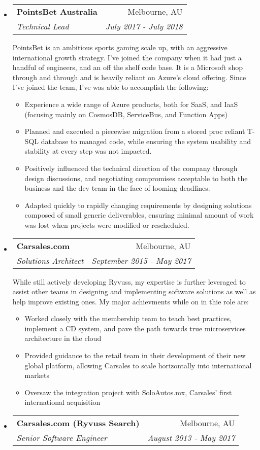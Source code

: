 \documentclass[letterpaper,11pt]{article}
\makeatletter
\newcommand{\resitem}[1]{\item #1 \vspace{-2pt}}
\newcommand{\ressubheading}[4]{
\begin{tabular*}{6.5in}{l@{\cftdotfill{\cftsecdotsep}\extracolsep{\fill}}r}
		\textbf{#1} & #2 \\
		\textit{#3} & \textit{#4} \\
\end{tabular*}}
\makeatother
\begin{document}
\begin{itemize}
\item[]
	\ressubheading{PointsBet Australia}{Melbourne, AU}{Technical Lead}{July 2017 - July 2018}
	
	PointsBet is an ambitious sports gaming scale up, with an aggressive international growth strategy. I've joined the company when it had just a handful of engineers, and an off the shelf code base. It is a Microsoft shop through and through and is heavily reliant on Azure's cloud offering. Since I've joined the team, I've was able to accomplish the following:
	
	\begin{itemize}
		\resitem{Experience a wide range of Azure products, both for SaaS, and IaaS (focusing mainly on CosmosDB, ServiceBus, and Function Apps)}
		\resitem{Planned and executed a piecewise migration from a stored proc reliant T-SQL database to managed code, while ensuring the system usability and stability at every step was not impacted.}
		\resitem{Positively influenced the technical direction of the company through design discussions, and negotiating compromises acceptable to both the business and the dev team in the face of looming deadlines.}
		\resitem{Adapted quickly to rapidly changing requirements by designing solutions composed of small generic deliverables, ensuring minimal amount of work was lost when projects were modified or rescheduled.}
	\end{itemize}
	
\item[]
	\ressubheading{Carsales.com}{Melbourne, AU}{Solutions Architect}{September 2015 - May 2017}

	While still actively developing Ryvuss, my expertise is further leveraged to assist other teams in designing and implementing software solutions as well as help improve existing ones. My major achievments while on in thie role are:
	\begin{itemize}
		\resitem{Worked closely with the membership team to teach best practices, implement a CD system, and pave the path towards true microservices architecture in the cloud}
		\resitem{Provided guidance to the retail team in their development of their new global platform, allowing Carsales to scale horizontally into international markets}
		\resitem{Oversaw the integration project with SoloAutos.mx, Carsales' first international acquisition}
	\end{itemize}
	
\item[]
	\ressubheading{Carsales.com (Ryvuss Search)}{Melbourne, AU}{Senior Software Engineer}{August 2013 - May 2017}
	

\end{itemize}
\end{document}

